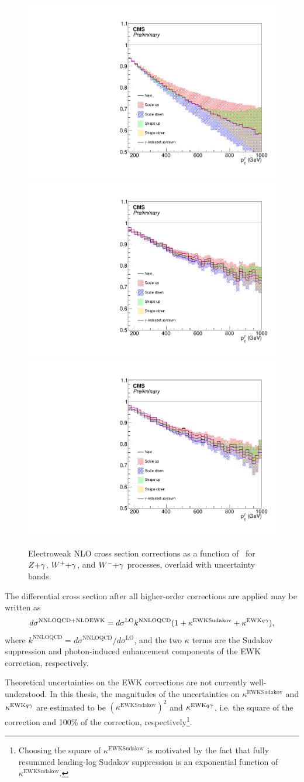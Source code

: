 \begin{figure}[htbp]
  \centering
  \includegraphics[width=0.4\linewidth]{Figures/vg/ewk_zg.pdf}
  \includegraphics[width=0.4\linewidth]{Figures/vg/ewk_wpg.pdf}
  \includegraphics[width=0.4\linewidth]{Figures/vg/ewk_wmg.pdf}
  \caption{
    Electroweak NLO cross section corrections as a function of \pTgamma\ for $Z{+}\gamma$, $W^\mathrm{+}{+}\gamma$, and $W^\mathrm{-}{+}\gamma$
    processes, overlaid with uncertainty bands.
  }
  \label{fig:ewk_correction}
\end{figure}

The differential cross section after all higher-order corrections are applied may be written as
\begin{equation}
  d\sigma^{\mathrm{NNLO QCD}+\mathrm{NLO EWK}} = d\sigma^{\mathrm{LO}} k^{\mathrm{NNLO QCD}} (1 + \kappa^{\mathrm{EWK Sudakov}} + \kappa^{\mathrm{EWK} q\gamma}),
\end{equation}
where $k^{\mathrm{NNLO QCD}} = d\sigma^{\mathrm{NNLO QCD}} / d\sigma^{\mathrm{LO}}$, and the two $\kappa$
terms are the Sudakov suppression and photon-induced enhancement components of the EWK
correction, respectively.

Theoretical uncertainties on the EWK corrections are not currently well-understood. In this thesis,
the magnitudes of the uncertainties on $\kappa^{\mathrm{EWK Sudakov}}$ and $\kappa^{\mathrm{EWK} q\gamma}$ are estimated
to be $(\kappa^{\mathrm{EWK Sudakov}})^2$ and $\kappa^{\mathrm{EWK} q\gamma}$, i.e. the square of
the correction and 100\% of the correction, respectively\footnote{Choosing the square of $\kappa^{\mathrm{EWK Sudakov}}$ is motivated by the fact
that fully resummed leading-log Sudakov suppression is an exponential function of $\kappa^{\mathrm{EWK Sudakov}}$.}.

